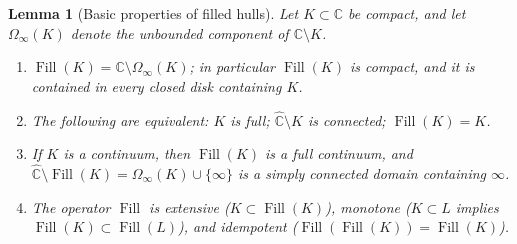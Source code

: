 \documentclass[11pt,reqno]{amsart}
\newtheorem{lemma}[theorem]{Lemma}
\theoremstyle{definition}
\theoremstyle{remark}
\newcommand{\C}{\mathbb C}
\newcommand{\Chat}{\widehat{\mathbb C}}
\newcommand{\Fill}{\operatorname{Fill}}
\begin{document}
\begin{lemma}[Basic properties of filled hulls]\label{lem:A-full}
Let $K\subset\C$ be compact, and let $\Omega_\infty(K)$ denote the
unbounded component of $\C\setminus K$.
\begin{enumerate}
\item $\Fill(K)=\C\setminus\Omega_\infty(K)$; in particular $\Fill(K)$ is
compact, and it is contained in every closed disk containing $K$.
\item The following are equivalent: $K$ is full; $\Chat\setminus K$ is
connected; $\Fill(K)=K$.
\item If $K$ is a continuum, then $\Fill(K)$ is a full continuum, and
$\Chat\setminus\Fill(K)=\Omega_\infty(K)\cup\{\infty\}$ is a simply
connected domain containing $\infty$.
\item The operator $\Fill$ is extensive ($K\subset\Fill(K)$), monotone
($K\subset L$ implies $\Fill(K)\subset\Fill(L)$), and idempotent
($\Fill(\Fill(K))=\Fill(K)$).
\end{enumerate}
\end{lemma}
\end{document}
